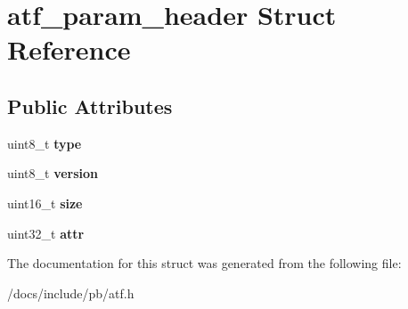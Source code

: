 \hypertarget{structatf__param__header}{}\section{atf\+\_\+param\+\_\+header Struct Reference}
\label{structatf__param__header}
\subsection*{Public Attributes}
\begin{DoxyCompactItemize}
\item 
\mbox{\label{structatf__param__header_ab1e78d3e127762dd33a4e02787e17a63}} 
uint8\+\_\+t {\bfseries type}
\item 
\mbox{\label{structatf__param__header_a5cd4022f1637f417e7249df749c48365}} 
uint8\+\_\+t {\bfseries version}
\item 
\mbox{\label{structatf__param__header_a024c07d3d5bf45f2e563fdb22d51a5c7}} 
uint16\+\_\+t {\bfseries size}
\item 
\mbox{\label{structatf__param__header_af34a45310cda5650f8e351e167dc4750}} 
uint32\+\_\+t {\bfseries attr}
\end{DoxyCompactItemize}


The documentation for this struct was generated from the following file\+:\begin{DoxyCompactItemize}
\item 
/docs/include/pb/atf.\+h\end{DoxyCompactItemize}
